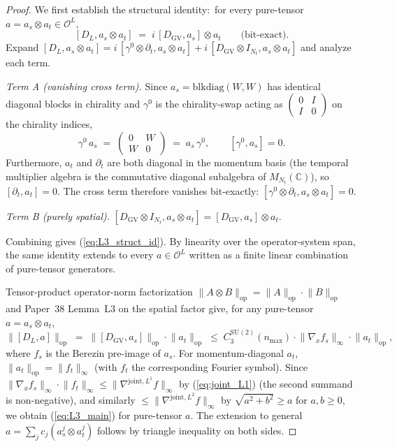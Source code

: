 \documentclass[11pt,a4paper]{article}
\theoremstyle{plain}
\theoremstyle{definition}
\newcommand{\nmax}{n_{\max}}
\newcommand{\Nt}{N_{t}}
\newcommand{\Op}{\mathcal{O}}
\newcommand{\opnorm}[1]{\lVert #1 \rVert_{\mathrm{op}}}
\newcommand{\norm}[1]{\lVert #1 \rVert}
\newcommand{\C}{\mathbb{C}}
\newcommand{\SU}{\mathrm{SU}}
\newcommand{\Mat}{M}
\newcommand{\DGV}{D_{\mathrm{GV}}}
\newcommand{\DL}{D_{L}}
\newcommand{\CthreeSU}{C_{3}^{\SU(2)}}
\begin{document}
\begin{proof}
We first establish the structural identity:\ for every pure-tensor
$a = a_{s} \otimes a_{t} \in \Op^{L}$,
\begin{equation}\label{eq:L3_struct_id}
   [\DL, a_{s} \otimes a_{t}]
   \;=\; i\,[\DGV, a_{s}] \otimes a_{t}
   \qquad \text{(bit-exact).}
\end{equation}
Expand
$[\DL, a_{s} \otimes a_{t}] = i\,[\gamma^{0} \otimes \partial_{t},
a_{s} \otimes a_{t}] + i\,[\DGV \otimes I_{\Nt}, a_{s} \otimes a_{t}]$
and analyze each term.

\emph{Term A (vanishing cross term).} Since $a_{s} =
\mathrm{blkdiag}(W, W)$ has identical diagonal blocks in chirality and
$\gamma^{0}$ is the chirality-swap acting as
$\begin{pmatrix} 0 & I \\ I & 0\end{pmatrix}$ on the chirality
indices,
\begin{equation*}
   \gamma^{0}\,a_{s} \;=\; \begin{pmatrix} 0 & W \\ W & 0\end{pmatrix}
   \;=\; a_{s}\,\gamma^{0}, \qquad [\gamma^{0}, a_{s}] = 0.
\end{equation*}
Furthermore, $a_{t}$ and $\partial_{t}$ are both diagonal in the
momentum basis (the temporal multiplier algebra is the commutative
diagonal subalgebra of $\Mat_{\Nt}(\C)$), so $[\partial_{t}, a_{t}] =
0$. The cross term therefore vanishes bit-exactly:
$[\gamma^{0} \otimes \partial_{t}, a_{s} \otimes a_{t}] = 0$.

\emph{Term B (purely spatial).}
$[\DGV \otimes I_{\Nt}, a_{s} \otimes a_{t}] = [\DGV, a_{s}] \otimes a_{t}$.

Combining gives (\ref{eq:L3_struct_id}). By linearity over the
operator-system span, the same identity extends to every
$a \in \Op^{L}$ written as a finite linear combination of pure-tensor
generators.

Tensor-product operator-norm factorization
$\opnorm{A \otimes B} = \opnorm{A} \cdot \opnorm{B}$ and Paper~38
Lemma~L3 on the spatial factor give, for any pure-tensor $a = a_{s}
\otimes a_{t}$,
\begin{equation}\label{eq:L3_pure_tensor}
   \opnorm{[\DL, a]}
   \;=\; \opnorm{[\DGV, a_{s}]} \cdot \opnorm{a_{t}}
   \;\le\; \CthreeSU(\nmax) \cdot \norm{\nabla_{x} f_{s}}_{\infty} \cdot \opnorm{a_{t}},
\end{equation}
where $f_{s}$ is the Berezin pre-image of $a_{s}$.
For momentum-diagonal $a_{t}$, $\opnorm{a_{t}} = \norm{f_{t}}_{\infty}$
(with $f_{t}$ the corresponding Fourier symbol). Since
$\norm{\nabla_{x} f_{s}}_{\infty} \cdot \norm{f_{t}}_{\infty} \le
\norm{\nabla^{\mathrm{joint}, L^{1}} f}_{\infty}$ by
(\ref{eq:joint_L1}) (the second summand is non-negative), and
similarly $\le \norm{\nabla^{\mathrm{joint}, L^{2}} f}_{\infty}$ by
$\sqrt{a^{2} + b^{2}} \ge a$ for $a, b \ge 0$, we obtain
(\ref{eq:L3_main}) for pure-tensor $a$. The extension to general
$a = \sum_{j} c_{j} (a_{s}^{j} \otimes a_{t}^{j})$ follows by triangle
inequality on both sides.


\end{proof}
\end{document}

